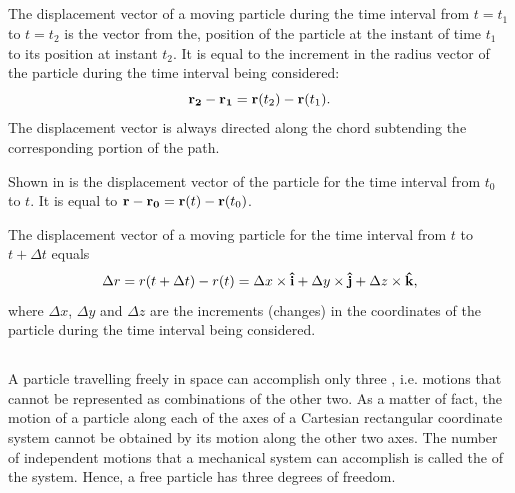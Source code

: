 \subsection{}\label{1.2.6} The displacement vector of a moving particle during the time interval from $t= t_{1}$ to $t= t_{2}$ is the vector from the, position of the particle at the instant of time $t_{1}$ to its position at instant $t_{2}$. It is equal to the increment in the radius vector of the particle during the time interval being considered:
\begin{equation*}%
\vb{r_{2}} - \vb{r_{1}} = \vb{r}(t_{2}) - \vb{r}(t_{1}).
\end{equation*}
The displacement vector is always directed along the chord subtending the corresponding portion of the path.

Shown in  is the displacement vector of the particle for the time interval from $t_{0}$ to $t$. It is equal to $\vb{r}- \vb{r_{0}} = \vb{r} (t)- \vb{r}(t_{0})$.

The displacement vector of a moving particle for the time inter­val from $t$ to $t + \Delta t$ equals
\begin{equation*}%
\Delta r = r (t + \Delta t) - r (t) = \Delta x \times \vu{i} + \Delta y \times \vu{j} + \Delta z \times \vu{k},
\end{equation*}
where $\Delta x$, $\Delta y$ and $\Delta z$ are the increments (changes) in the coordi­nates of the particle during the time interval being considered. 

\subsection{}\label{1.2.7} A particle travelling freely in space can accomplish only three , i.e. motions that cannot be repre­sented as combinations of the other two. As a matter of fact, the motion of a particle along each of the axes of a Cartesian rectangular coordinate system cannot be obtained by its motion along the other two axes. The number of independent motions that a mechanical system can accomplish is called the  of the system. Hence, a free particle has three degrees of freedom.

